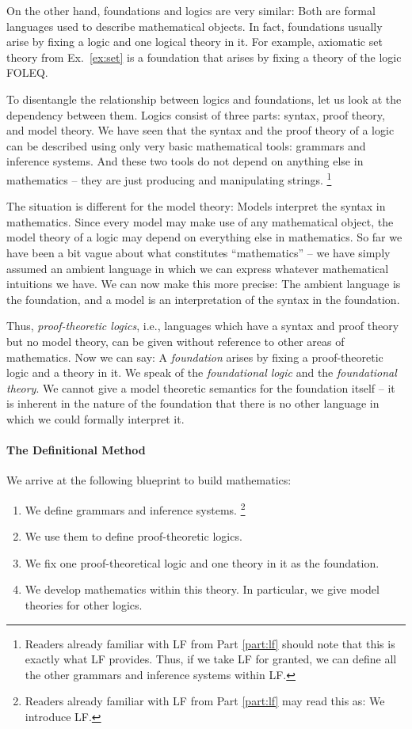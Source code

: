 On the other hand, foundations and logics are very similar: Both are formal languages used to describe mathematical objects. In fact, foundations usually arise by fixing a logic and one logical theory in it. For example, axiomatic set theory from Ex.~\ref{ex:set} is a foundation that arises by fixing a theory of the logic FOLEQ.
\medskip

To disentangle the relationship between logics and foundations, let us look at the dependency between them. Logics consist of three parts: syntax, proof theory, and model theory.
We have seen that the syntax and the proof theory of a logic can be described using only very basic mathematical tools: grammars and inference systems. And these two tools do not depend on anything else in mathematics -- they are just producing and manipulating strings.
\footnote{Readers already familiar with LF from Part \ref{part:lf} should note that this is exactly what LF provides. Thus, if we take LF for granted, we can define all the other grammars and inference systems within LF.}

The situation is different for the model theory: Models interpret the syntax in mathematics. Since every model may make use of any mathematical object, the model theory of a logic may depend on everything else in mathematics. So far we have been a bit vague about what constitutes ``mathematics'' -- we have simply assumed an ambient language in which we can express whatever mathematical intuitions we have. We can now make this more precise: The ambient language is the foundation, and a model is an interpretation of the syntax in the foundation.
\medskip

Thus, \emph{proof-theoretic logics}, i.e., languages which have a syntax and proof theory but no model theory, can be given without reference to other areas of mathematics.
Now we can say: A \emph{foundation} arises by fixing a proof-theoretic logic and a theory in it. We speak of the \emph{foundational logic} and the \emph{foundational theory}.
We cannot give a model theoretic semantics for the foundation itself -- it is inherent in the nature of the foundation that there is no other language in which we could formally interpret it.

\paragraph{The Definitional Method}
We arrive at the following blueprint to build mathematics:
\begin{enumerate}
 \item We define grammars and inference systems.
 \footnote{Readers already familiar with LF from Part \ref{part:lf} may read this as: We introduce LF.}
 \item We use them to define proof-theoretic logics.
 \item We fix one proof-theoretical logic and one theory in it as the foundation.
 \item We develop mathematics within this theory. In particular, we give model theories for other logics.
\end{enumerate}

